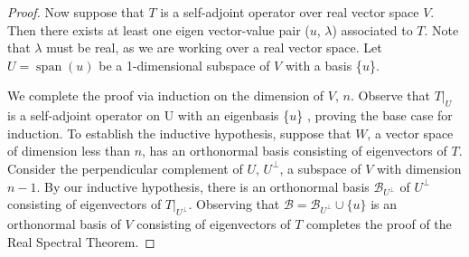 \documentclass[letterpaper,12pt]{article}
\newcommand{\an}[1]{{\leavevmode\color{red}{#1}}}
\begin{document}
\begin{proof}
  Now suppose that $T$ is a self-adjoint operator over real vector space $V$. Then there exists at least one eigen vector-value pair ($u$, $\lambda$) associated to $T$. Note that $\lambda$ must be real, as we are working over a real vector space. \an{This is not true: $A = (0 1; -1 0)$ is real-valued but has complex spectrum.} Let $U = \operatorname{span}(u)$ be a 1-dimensional subspace of $V$ with a basis \{$u$\}.

  We complete the proof via induction on the dimension of $V$, $n$. Observe that $T|_{U}$ is a self-adjoint operator on U with an eigenbasis \{$u$\} \an{(you would need to prove this)}, proving the base case for induction. To establish the inductive hypothesis, suppose that $W$, a vector space of dimension less than $n$, has an orthonormal basis consisting of \an{(a subset of the?)} eigenvectors of $T$. Consider the perpendicular complement of $U$, $U^{\perp}$, a subspace of $V$ with dimension $n-1$. \an{? Why does $U^\perp$ have dimension $n-1$?} By our inductive hypothesis, there is an orthonormal basis $\mathcal{B}_{U^{\perp}}$ of $U^{\perp}$ consisting of eigenvectors of $T|_{U^{\perp}}$. Observing that 
$\mathcal{B} = \mathcal{B}_{U^{\perp}} \cup \{u\}$ 
  is an orthonormal basis of $V$ \an{(again, you need to prove this)} consisting of eigenvectors of $T$ completes the proof of the Real Spectral Theorem.
\end{proof}
\end{document}
